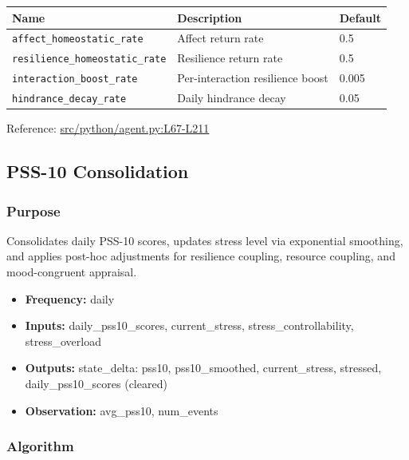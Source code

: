 \documentclass[
  letterpaper,
  DIV=11,
  numbers=noendperiod]{scrartcl}
\providecommand{\tightlist}{%
  \setlength{\itemsep}{0pt}\setlength{\parskip}{0pt}}
\newcommand{\trow}[3]{%
  \texttt{\allowbreak #1} & #2 & #3 \\
}
\begin{document}
\begin{tabularx}{\textwidth}{p{4.5cm}Xp{2cm}}
\toprule
\textbf{Name} & \textbf{Description} & \textbf{Default} \\
\midrule
\trow{affect\_homeostatic\_rate}{Affect return rate}{0.5}
\trow{resilience\_homeostatic\_rate}{Resilience return rate}{0.5}
\trow{interaction\_boost\_rate}{Per-interaction resilience boost}{0.005}
\trow{hindrance\_decay\_rate}{Daily hindrance decay}{0.05}
\bottomrule
\end{tabularx}

Reference:
\href{https://github.com/namakala/abm-simulation/blob/84ff9b37fb0c569bef9f122e789d9c23a89348ec/src/python/agent.py\#L67-L211}{src/python/agent.py:L67-L211}

\subsection{PSS-10 Consolidation}\label{pss-10-consolidation}

\subsubsection{Purpose}\label{purpose-9}

Consolidates daily PSS-10 scores, updates stress level via exponential
smoothing, and applies post-hoc adjustments for resilience coupling,
resource coupling, and mood-congruent appraisal.

\begin{itemize}
\tightlist
\item
  \textbf{Frequency:} daily
\item
  \textbf{Inputs:} daily\_pss10\_scores, current\_stress,
  stress\_controllability, stress\_overload
\item
  \textbf{Outputs:} state\_delta: pss10, pss10\_smoothed,
  current\_stress, stressed, daily\_pss10\_scores (cleared)
\item
  \textbf{Observation:} avg\_pss10, num\_events
\end{itemize}

\subsubsection{Algorithm}\label{algorithm-7}
\end{document}
